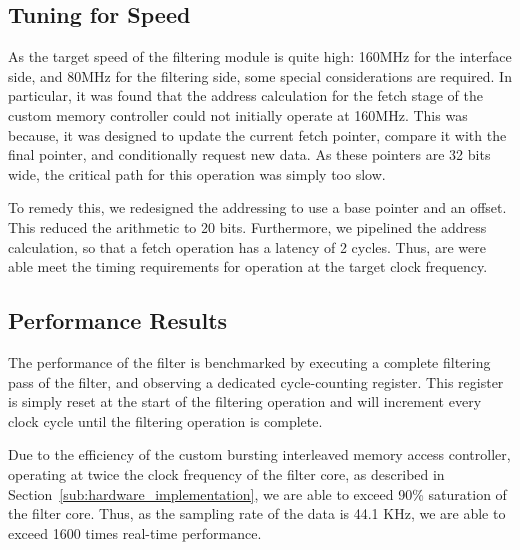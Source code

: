 \documentclass[]{article}
\begin{document}


\subsection{Tuning for Speed} %
\label{sub:tuning_for_speed}

As the target speed of the filtering module is quite high: 160MHz for the interface side, and 80MHz for the filtering side, some special considerations are required.
In particular, it was found that the address calculation for the fetch stage of the custom memory controller could not initially operate at 160MHz.
This was because, it was designed to update the current fetch pointer, compare it with the final pointer, and conditionally request new data. As these pointers are 32 bits wide, the critical path for this operation was simply too slow.

To remedy this, we redesigned the addressing to use a base pointer and an offset. This reduced the arithmetic to 20 bits. Furthermore, we pipelined the address calculation, so that a fetch operation has a latency of 2 cycles.
Thus, are were able meet the timing requirements for operation at the target clock frequency.



\subsection{Performance Results} %
\label{sub:performance_results}

The performance of the filter is benchmarked by executing a complete filtering pass of the filter, and observing a dedicated cycle-counting register. This register is simply reset at the start of the filtering operation and will increment every clock cycle until the filtering operation is complete.

Due to the efficiency of the custom bursting interleaved memory access controller, operating at twice the clock frequency of the filter core, as described in Section~\ref{sub:hardware_implementation}, we are able to exceed 90\% saturation of the filter core.
Thus, as the sampling rate of the data is 44.1 KHz, we are able to exceed 1600 times real-time performance.
\end{document}
